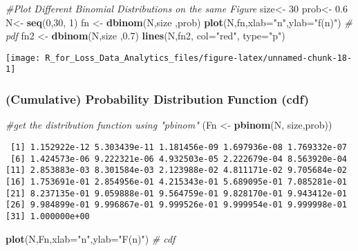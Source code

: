 \documentclass[]{book}
\newenvironment{Shaded}{\begin{snugshade}}{\end{snugshade}}
\newcommand{\KeywordTok}[1]{\textcolor[rgb]{0.13,0.29,0.53}{\textbf{#1}}}
\newcommand{\DataTypeTok}[1]{\textcolor[rgb]{0.13,0.29,0.53}{#1}}
\newcommand{\DecValTok}[1]{\textcolor[rgb]{0.00,0.00,0.81}{#1}}
\newcommand{\FloatTok}[1]{\textcolor[rgb]{0.00,0.00,0.81}{#1}}
\newcommand{\StringTok}[1]{\textcolor[rgb]{0.31,0.60,0.02}{#1}}
\newcommand{\CommentTok}[1]{\textcolor[rgb]{0.56,0.35,0.01}{\textit{#1}}}
\newcommand{\NormalTok}[1]{#1}
\theoremstyle{definition}
\theoremstyle{definition}
\theoremstyle{definition}
\theoremstyle{remark}
\begin{document}
\begin{Shaded}
\begin{Highlighting}[]
\CommentTok{#Plot Different Binomial Distributions on the same Figure}
\NormalTok{size<-}\StringTok{ }\DecValTok{30}
\NormalTok{prob<-}\StringTok{ }\FloatTok{0.6}
\NormalTok{N<-}\StringTok{ }\KeywordTok{seq}\NormalTok{(}\DecValTok{0}\NormalTok{,}\DecValTok{30}\NormalTok{, }\DecValTok{1}\NormalTok{)}
\NormalTok{fn <-}\StringTok{ }\KeywordTok{dbinom}\NormalTok{(N,size ,prob)}
\KeywordTok{plot}\NormalTok{(N,fn,}\DataTypeTok{xlab=}\StringTok{"n"}\NormalTok{,}\DataTypeTok{ylab=}\StringTok{"f(n)"}\NormalTok{) }\CommentTok{# pdf}
\NormalTok{fn2 <-}\StringTok{ }\KeywordTok{dbinom}\NormalTok{(N,size ,}\FloatTok{0.7}\NormalTok{)}
\KeywordTok{lines}\NormalTok{(N,fn2, }\DataTypeTok{col=}\StringTok{"red"}\NormalTok{, }\DataTypeTok{type=}\StringTok{"p"}\NormalTok{)}
\end{Highlighting}
\end{Shaded}

\begin{center}\texttt{[image: R\_for\_Loss\_Data\_Analytics\_files/figure-latex/unnamed-chunk-18-1]} \end{center}

\subsubsection{(Cumulative) Probability Distribution Function
(cdf)}\label{cumulative-probability-distribution-function-cdf-2}

\begin{Shaded}
\begin{Highlighting}[]
\CommentTok{#get the distribution function using "pbinom"}
\NormalTok{(Fn <-}\StringTok{ }\KeywordTok{pbinom}\NormalTok{(N, size,prob))}
\end{Highlighting}
\end{Shaded}

\begin{verbatim}
 [1] 1.152922e-12 5.303439e-11 1.181456e-09 1.697936e-08 1.769332e-07
 [6] 1.424573e-06 9.222321e-06 4.932503e-05 2.222679e-04 8.563920e-04
[11] 2.853883e-03 8.301584e-03 2.123988e-02 4.811171e-02 9.705684e-02
[16] 1.753691e-01 2.854956e-01 4.215343e-01 5.689095e-01 7.085281e-01
[21] 8.237135e-01 9.059888e-01 9.564759e-01 9.828170e-01 9.943412e-01
[26] 9.984899e-01 9.996867e-01 9.999526e-01 9.999954e-01 9.999998e-01
[31] 1.000000e+00
\end{verbatim}

\begin{Shaded}
\begin{Highlighting}[]
\KeywordTok{plot}\NormalTok{(N,Fn,}\DataTypeTok{xlab=}\StringTok{"n"}\NormalTok{,}\DataTypeTok{ylab=}\StringTok{"F(n)"}\NormalTok{) }\CommentTok{# cdf}
\end{Highlighting}
\end{Shaded}
\end{document}
